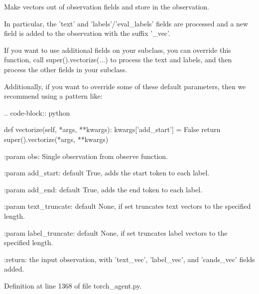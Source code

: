 \begin{DoxyVerb}Make vectors out of observation fields and store in the observation.

In particular, the 'text' and 'labels'/'eval_labels' fields are
processed and a new field is added to the observation with the suffix
'_vec'.

If you want to use additional fields on your subclass, you can override
this function, call super().vectorize(...) to process the text and
labels, and then process the other fields in your subclass.

Additionally, if you want to override some of these default parameters,
then we recommend using a pattern like:

.. code-block:: python

  def vectorize(self, *args, **kwargs):
      kwargs['add_start'] = False
      return super().vectorize(*args, **kwargs)


:param obs:
    Single observation from observe function.

:param add_start:
    default True, adds the start token to each label.

:param add_end:
    default True, adds the end token to each label.

:param text_truncate:
    default None, if set truncates text vectors to the specified
    length.

:param label_truncate:
    default None, if set truncates label vectors to the specified
    length.

:return:
    the input observation, with 'text_vec', 'label_vec', and
    'cands_vec' fields added.
\end{DoxyVerb}
 

Definition at line 1368 of file torch\+\_\+agent.\+py.


